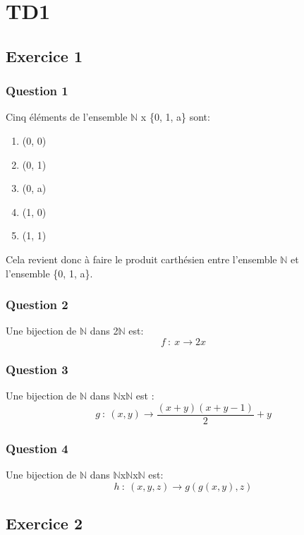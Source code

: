 \section{TD1}

\subsection{Exercice 1}

\subsubsection{Question 1}

Cinq éléments de l'ensemble $\mathbb{N}$ x \{0, 1, a\} sont:
\begin{enumerate}
  \item (0, 0)
  \item (0, 1)
  \item (0, a)
  \item (1, 0)
  \item (1, 1)
\end{enumerate}

Cela revient donc à faire le produit carthésien entre l'ensemble $\mathbb{N}$ et
\\ l'ensemble \{0, 1, a\}.

\subsubsection{Question 2}

Une bijection de $\mathbb{N}$ dans 2$\mathbb{N}$ est:
$$f~:~x\rightarrow2x$$

\subsubsection{Question 3}

Une bijection de $\mathbb{N}$ dans $\mathbb{N}$x$\mathbb{N}$ est :
$$g~:~(x,y)\rightarrow\frac{(x+y)(x+y-1)}{2}+y$$

\subsubsection{Question 4}

Une bijection de $\mathbb{N}$ dans $\mathbb{N}$x$\mathbb{N}$x$\mathbb{N}$ est:
$$h~:~(x,y,z)\rightarrow g(g(x,y),z)$$

\newpage

\subsection{Exercice 2}

